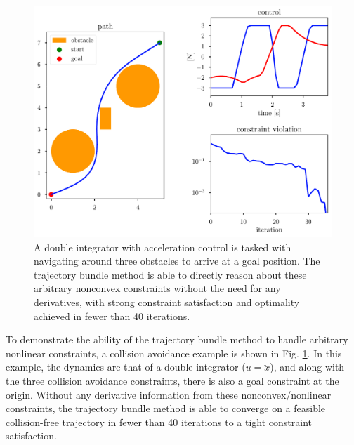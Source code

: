 \begin{figure}
    \centering
    \includegraphics[width=0.9\linewidth]{bundles/examples/obstacle_fig.pdf}
    \caption{A double integrator with acceleration control is tasked with navigating around three obstacles to arrive at a goal position. The trajectory bundle method is able to directly reason about these arbitrary nonconvex constraints without the need for any derivatives, with strong constraint satisfaction and optimality achieved in fewer than 40 iterations.}
    \label{fig:btb:obstacle}
\end{figure}


To demonstrate the ability of the trajectory bundle method to handle arbitrary nonlinear constraints, a collision avoidance example is shown in Fig. \ref{fig:btb:obstacle}. In this example, the dynamics are that of a double integrator ($u = \ddot{x}$), and along with the three collision avoidance constraints, there is also a goal constraint at the origin. Without any derivative information from these nonconvex/nonlinear constraints, the trajectory bundle method is able to converge on a feasible collision-free trajectory in fewer than 40 iterations to a tight constraint satisfaction.







